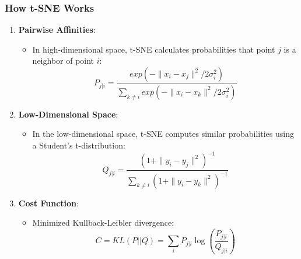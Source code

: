 \documentclass{beamer}
\begin{document}
\begin{frame}[fragile]
    \frametitle{How t-SNE Works}
    \begin{enumerate}
        \item \textbf{Pairwise Affinities}:
        \begin{itemize}
            \item In high-dimensional space, t-SNE calculates probabilities that point \( j \) is a neighbor of point \( i \):
            \begin{equation}
            P_{j|i} = \frac{exp(-\|x_i - x_j\|^2/2\sigma_i^2)}{\sum_{k \neq i} exp(-\|x_i - x_k\|^2/2\sigma_i^2)}
            \end{equation}
        \end{itemize}
        
        \item \textbf{Low-Dimensional Space}:
        \begin{itemize}
            \item In the low-dimensional space, t-SNE computes similar probabilities using a Student's t-distribution:
            \begin{equation}
            Q_{j|i} = \frac{(1 + \|y_i - y_j\|^2)^{-1}}{\sum_{k \neq i} (1 + \|y_i - y_k\|^2)^{-1}}
            \end{equation}
        \end{itemize}
        
        \item \textbf{Cost Function}:
        \begin{itemize}
            \item Minimized Kullback-Leibler divergence:
            \begin{equation}
            C = KL(P || Q) = \sum_{i} P_{j|i} \log\left(\frac{P_{j|i}}{Q_{j|i}}\right)
            \end{equation}
        \end{itemize}
    \end{enumerate}
\end{frame}
\end{document}
